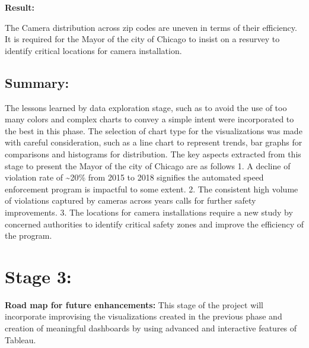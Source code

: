 \documentclass[]{book}
\begin{document}
\textbf{Result:}

The Camera distribution across zip codes are uneven in terms of their efficiency. It is required for the Mayor of the city of Chicago to insist on a resurvey to identify critical locations for camera installation.

\hypertarget{summary}{%
\section{Summary:}\label{summary}}

The lessons learned by data exploration stage, such as to avoid the use of too many colors and complex charts to convey a simple intent were incorporated to the best in this phase. The selection of chart type for the visualizations was made with careful consideration, such as a line chart to represent trends, bar graphs for comparisons and histograms for distribution.
The key aspects extracted from this stage to present the Mayor of the city of Chicago are as follows
1. A decline of violation rate of \textasciitilde{}20\% from 2015 to 2018 signifies the automated speed enforcement program is impactful to some extent.
2. The consistent high volume of violations captured by cameras across years calls for further safety improvements.
3. The locations for camera installations require a new study by concerned authorities to identify critical safety zones and improve the efficiency of the program.

\hypertarget{stage-3}{%
\chapter{Stage 3:}\label{stage-3}}

\textbf{Road map for future enhancements:}
This stage of the project will incorporate improvising the visualizations created in the previous phase and creation of meaningful dashboards by using advanced and interactive features of Tableau.


\end{document}
